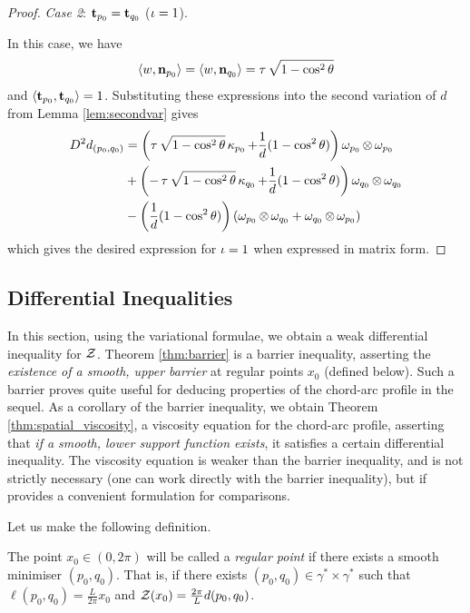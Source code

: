 \documentclass[12pt]{amsart}
\begin{document}
\begin{proof}
\emph{Case 2}: $\operatorname{\mathbf{t}}_{p_0} = \operatorname{\mathbf{t}}_{q_0}$ ($\operatorname{\iota} = 1$).

In this case, we have 
\[
\langle{w},{\operatorname{\mathbf{n}}_{p_0}}\rangle = \langle{w},{\operatorname{\mathbf{n}}_{q_0}}\rangle = \operatorname{\tau} \sqrt{1-\cos^2\theta}
\]
and $\langle{\operatorname{\mathbf{t}}_{p_0}},{\operatorname{\mathbf{t}}_{q_0}}\rangle = 1$. Substituting these expressions into the second variation of $d$  from Lemma \ref{lem:secondvar} gives
\begin{align*}
D^2d_{(p_0,q_0)} &=  \left(\operatorname{\tau} \sqrt{1-\cos^2\theta}\operatorname{\kappa}_{p_0} + \frac{1}{d}(1 - \cos^2\theta) \right) \omega_{p_0} \operatorname{\otimes} \omega_{p_0} \\
&+ \left(-\operatorname{\tau} \sqrt{1-\cos^2\theta} \operatorname{\kappa}_{q_0} + \frac{1}{d}(1 - \cos^2\theta) \right) \omega_{q_0} \operatorname{\otimes} \omega_{q_0} \\
&- \left(\frac{1}{d}(1 - \cos^2\theta) \right) \left(\omega_{p_0} \operatorname{\otimes} \omega_{q_0} + \omega_{q_0} \operatorname{\otimes} \omega_{p_0} \right)
\end{align*}
which gives the desired expression for $\operatorname{\iota}=1$ when expressed in matrix form.
\end{proof}

\subsection{Differential Inequalities}
\label{sec:orgheadline9}

In this section, using the variational formulae, we obtain a weak differential inequality for \(\operatorname{\mathcal{Z}}\). Theorem \ref{thm:barrier} is a barrier inequality, asserting the \emph{existence of a smooth, upper barrier} at regular points \(x_0\) (defined below). Such a barrier proves quite useful for deducing properties of the chord-arc profile in the sequel. As a corollary of the barrier inequality, we obtain Theorem \ref{thm:spatial_viscosity}, a viscosity equation for the chord-arc profile, asserting that \emph{if a smooth, lower support function exists}, it satisfies a certain differential inequality. The viscosity equation is weaker than the barrier inequality, and is not strictly necessary (one can work directly with the barrier inequality), but if provides a convenient formulation for comparisons.

Let us make the following definition.
\begin{defn}
The point \(x_0 \in (0, 2\pi)\) will be called a \emph{regular point} if there exists a smooth minimiser \((p_0, q_0)\). That is, if there exists \((p_0, q_0) \in \gamma^{\ast} \times \gamma^{\ast}\) such that \(\ell(p_0, q_0) = \tfrac{L}{2\pi} x_0\) and \(\operatorname{\mathcal{Z}}(x_0) = \tfrac{2\pi}{L} d(p_0, q_0)\).
\end{defn}
\end{document}
